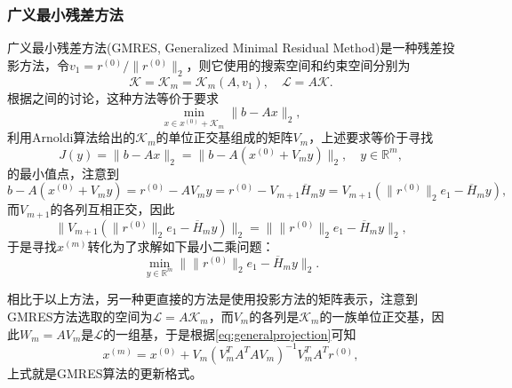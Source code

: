 \documentclass[a4paper,10pt]{ctexart}
\begin{document}
\subsubsection{广义最小残差方法}
广义最小残差方法(GMRES, Generalized Minimal Residual Method)是一种残差投影方法，令$ v_1 = r^{(0)} / \| r^{(0)} \|_2 $，则它使用的搜索空间和约束空间分别为
\[
    \mathcal{K} = \mathcal{K}_m = \mathcal{K}_m(A,v_1),\quad \mathcal{L} = A \mathcal{K}.
\]
根据之间的讨论，这种方法等价于要求
\[
    \min_{x\in x^{(0)}+\mathcal{K}_m} \| b - Ax \|_2,
\]
利用Arnoldi算法给出的$ \mathcal{K}_m $的单位正交基组成的矩阵$ V_m $，上述要求等价于寻找
\[
    J(y) = \| b - Ax \|_2 = \| b - A(x^{(0)} + V_m y) \|_2,\quad y\in \mathbb{R}^m,
\]
的最小值点，注意到
\[
    b - A(x^{(0)} + V_m y) = r^{(0)} - AV_m y = r^{(0)} - V_{m+1} \overline{H}_m y = V_{m+1}(\| r^{(0)} \|_2 e_1 - \overline{H}_m y),
\]
而$ V_{m+1} $的各列互相正交，因此
\[
    \| V_{m+1}(\| r^{(0)} \|_2 e_1 - \overline{H}_m y) \|_2 = \|  \| r^{(0)} \|_2 e_1 - \overline{H}_m y \|_2,
\]
于是寻找$ x^{(m)} $转化为了求解如下最小二乘问题：
\begin{equation}
    \min_{y\in \mathbb{R}^m} \|  \| r^{(0)} \|_2 e_1 - \overline{H}_m y \|_2.
\end{equation}

相比于以上方法，另一种更直接的方法是使用投影方法的矩阵表示，注意到GMRES方法选取的空间为$ \mathcal{L} = A \mathcal{K}_m $，而$ V_m $的各列是$ \mathcal{K}_m $的一族单位正交基，因此$ W_m = AV_m $是$ \mathcal{L} $的一组基，于是根据\ref{eq:generalprojection}可知
\begin{equation}
    x^{(m)} = x^{(0)} + V_m(V_m^TA^TAV_m)^{-1}V_m^TA^Tr^{(0)},
\end{equation}
上式就是GMRES算法的更新格式。
\end{document}
